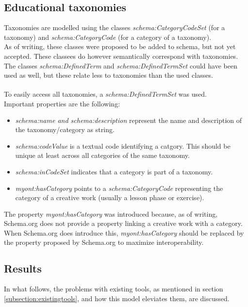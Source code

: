 \documentclass[a4paper]{report}
\begin{document}
    \subsection{Educational taxonomies}
    Taxonomies are modelled using the classes \textit{schema:CategoryCodeSet} (for a taxonomy) and \textit{schema:CategoryCode} (for a category of a taxonomy).\\
    As of writing, these classes were proposed to be added to schema, but not yet accepted. These classees do however semantically correspond with taxonomies.\\
    The classes \textit{schema:DefinedTerm}  and \textit{schema:DefinedTermSet} could have been used as well, but these relate less to taxonomies than the used classes.\\ \\
    To easily access all taxonomies, a \textit{schema:DefinedTermSet} was used.\\
    Important properties are the following:
    \begin{itemize}
        \item \emph{schema:name and schema:description} represent the name and description of the taxonomy/category as string.
        \item \emph{schema:codeValue} is a textual code identifying a catgory. This should be unique at least across all categories of the same taxonomy.
        \item \emph{schema:inCodeSet} indicates that a category is part of a taxonomy.
        \item \emph{myont:hasCategory} points to a \emph{schema:CategoryCode} representing the category of a creative work (usually a lesson phase or exercise).
    \end{itemize}
    The property \textit{myont:hasCategory} was introduced because, as of writing, Schema.org does not provide a property linking a creative work with a category.
    When Schema.org does introduce this, \textit{myont:hasCategory} should be replaced by the property proposed by Schema.org to maximize interoperability.

    \subsection{Results}
    In what follows, the problems with existing tools, as mentioned in section \ref{subsection:existingtools}, and how this model eleviates them, are discussed.
\end{document}
